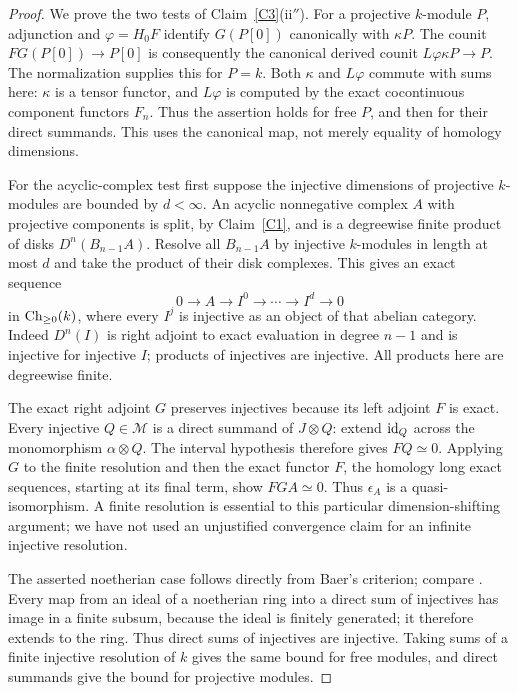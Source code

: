 \begin{proof}
We prove the two tests of Claim~\ref{C3}(ii$''$). For a projective $k$-module $P$, adjunction and $\varphi=H_0F$ identify $G(P[0])$ canonically with $\kappa P$. The counit $FG(P[0])\to P[0]$ is consequently the canonical derived counit $L\varphi\kappa P\to P$. The normalization supplies this for $P=k$. Both $\kappa$ and $L\varphi$ commute with sums here: $\kappa$ is a tensor functor, and $L\varphi$ is computed by the exact cocontinuous component functors $F_n$. Thus the assertion holds for free $P$, and then for their direct summands. This uses the canonical map, not merely equality of homology dimensions.

For the acyclic-complex test first suppose the injective dimensions of projective $k$-modules are bounded by $d<\infty$. An acyclic nonnegative complex $A$ with projective components is split, by Claim~\ref{C1}, and is a degreewise finite product of disks $D^n(B_{n-1}A)$. Resolve all $B_{n-1}A$ by injective $k$-modules in length at most $d$ and take the product of their disk complexes. This gives an exact sequence
\[
 0\longrightarrow A\longrightarrow I^0\longrightarrow\cdots
 \longrightarrow I^d\longrightarrow0
\]
in $\operatorname{Ch}_{\geq0}(k)$, where every $I^j$ is injective as an object of that abelian category. Indeed $D^n(I)$ is right adjoint to exact evaluation in degree $n-1$ and is injective for injective $I$; products of injectives are injective. All products here are degreewise finite.

The exact right adjoint $G$ preserves injectives because its left adjoint $F$ is exact. Every injective $Q\in\mathcal M$ is a direct summand of $J\otimes Q$: extend $\operatorname{id}_Q$ across the monomorphism $\alpha\otimes Q$. The interval hypothesis therefore gives $FQ\simeq0$. Applying $G$ to the finite resolution and then the exact functor $F$, the homology long exact sequences, starting at its final term, show $FGA\simeq0$. Thus $\epsilon_A$ is a quasi-isomorphism. A finite resolution is essential to this particular dimension-shifting argument; we have not used an unjustified convergence claim for an infinite injective resolution.

The asserted noetherian case follows directly from Baer's criterion; compare \citet[Lemma 47.3.7]{StacksNoethInjectiveSums}. Every map from an ideal of a noetherian ring into a direct sum of injectives has image in a finite subsum, because the ideal is finitely generated; it therefore extends to the ring. Thus direct sums of injectives are injective. Taking sums of a finite injective resolution of $k$ gives the same bound for free modules, and direct summands give the bound for projective modules.


\end{proof}
